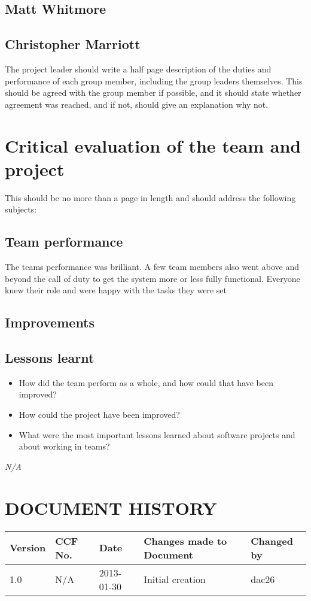 \documentclass{project}
\begin{document}
\subsection{Matt Whitmore}


\subsection{Christopher Marriott}

The project leader should write a half page description of the duties and
performance of each group member, including the group leaders themselves. This should be agreed with the
group member if possible, and it should state whether agreement was reached, and if not, should give an
explanation why not.


\section{Critical evaluation of the team and project}
This should be no more than a page in length and should address
the following subjects:
\subsection{Team performance}
The teams performance was brilliant. A few team members also went above and beyond the call of duty to get the system more or less fully functional. Everyone knew their role and were happy with the tasks they were set 

\subsection{Improvements}


\subsection{Lessons learnt}

\begin{itemize}
	\item How did the team perform as a whole, and how could that have been improved?
	\item How could the project have been improved?
	\item What were the most important lessons learned about software projects and about working in teams?

\end{itemize}
\clearpage
{}
\begin{thebibliography}{5}
\bibitem{} \emph{N/A}
\end{thebibliography}
\clearpage
{}
\section*{DOCUMENT HISTORY}
\begin{tabular}{|l | l | l | l | l |}
\hline
Version & CCF No. & Date & Changes made to Document & Changed by \\
\hline
1.0 & N/A & 2013-01-30 & Initial creation & dac26 \\
\hline
\end{tabular}
\label{thelastpage}
\end{document}
